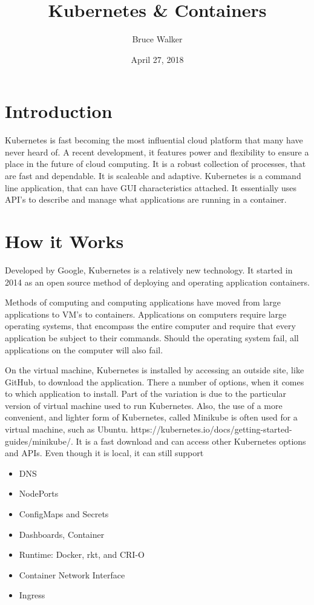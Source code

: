 \documentclass[12pt, letterpaper]{article}
\title{Kubernetes \& Containers}
\author{Bruce Walker}
\date{ April 27, 2018}
\begin{document}
\maketitle 

\section*{Introduction}
\setlength{\parskip}{1em}
\indent 
Kubernetes is fast becoming the most influential cloud platform that
many have never heard of.  A recent development, it features power and
flexibility to ensure a place in the future of cloud computing.  It is
a robust collection of processes, that are fast and dependable.  It is
scaleable and adaptive. Kubernetes is a command line application, that
can have GUI characteristics attached.  It essentially uses API's to
describe and manage what applications are running in a container.
\cite {hid-sp18-525-concept}

\section *{How it Works}
\setlength{\parskip}{1.3em}

Developed by Google, Kubernetes is a relatively new technology.  It
started in 2014 as an open source method of deploying and operating
application containers.  

Methods of computing and computing applications have moved from large
applications to VM's to containers.  Applications on computers require
large operating systems, that encompass the entire computer and
require that every application be subject to their commands.  Should
the operating system fail, all applications on the computer will also
fail.   

On the virtual machine, Kubernetes is installed by accessing an
outside site, like GitHub, to download the application.  There a
number of options, when it comes to which application to install.
Part of the variation is due to the particular version of virtual
machine used to run Kubernetes.  Also, the use of a more convenient,
and lighter form of Kubernetes, called Minikube is often used for a
virtual machine, such as
Ubuntu. https://kubernetes.io/docs/getting-started-guides/minikube/.
It is a fast download and can access other Kubernetes options and
APIs.  Even though it is local, it can still support \cite {hid-sp18-525-concept}
\begin{itemize}
    \item DNS 
    
    \item NodePorts 
    
    \item ConfigMaps and Secrets 
    
    \item Dashboards, Container 
    
    \item Runtime:  Docker, rkt, and CRI-O 
    
    \item Container Network Interface
    
    \item Ingress  
 \end{itemize}   
 
\end{document}
